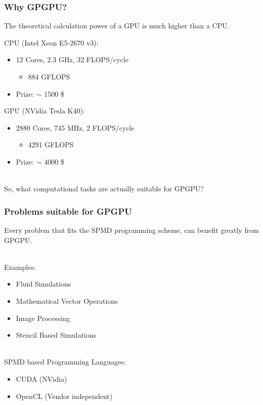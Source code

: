 \documentclass{beamer}
\begin{document}
\begin{frame}
    \frametitle{Why GPGPU?}

    The \alert{theoretical} calculation power of a GPU is much higher
    than a CPU.

    \begin{example}
        CPU (Intel Xeon E5-2670 v3):
        \begin{itemize}
            \item 12 Cores, 2.3 GHz, 32 FLOPS/cycle
            \begin{itemize}
                \item \alert{884 GFLOPS}
            \end{itemize}
            \item Prize: $\sim$ \alert{1500} \$
        \end{itemize}
        GPU (NVidia Tesla K40):
        \begin{itemize}
            \item 2880 Cores, 745 MHz, 2 FLOPS/cycle
            \begin{itemize}
                \item \alert{4291 GFLOPS}
            \end{itemize}
            \item Prize: $\sim$ \alert{4000} \$
        \end{itemize}
    \end{example}
    ~\\
    So, what computational tasks are actually suitable for GPGPU?
\end{frame}

\begin{frame}
    \frametitle{Problems suitable for GPGPU}
    Every problem that fits the \alert{SPMD} programming scheme, can benefit greatly
    from GPGPU.
    
    ~\\ 
    Examples:
    \begin{itemize}
        \item Fluid Simulations
        \item Mathematical Vector Operations
        \item Image Processing
        \item Stencil Based Simulations 
    \end{itemize}
    
    ~\\
    SPMD based Programming Languages:
    \begin{itemize}
        \item CUDA (NVidia)
        \item OpenCL (Vendor independent)
    \end{itemize}
\end{frame}
\end{document}
